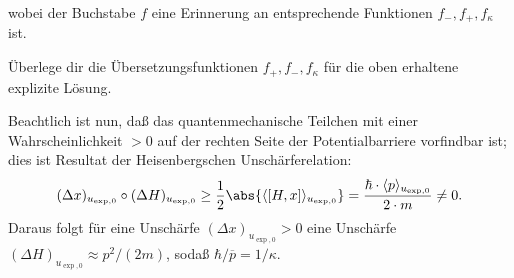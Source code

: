 \documentclass{subfiles}
\begin{document}
    wobei der Buchstabe $f$ eine Erinnerung an entsprechende Funktionen $f_-,f_+,f_\kappa$ ist. 
    \begin{Aufgabe}
        \nr{} Überlege dir die Übersetzungsfunktionen $f_+,f_-,f_\kappa$ für die oben erhaltene explizite Lösung. 
    \end{Aufgabe}
    Beachtlich ist nun, daß das quantenmechanische Teilchen mit einer Wahrscheinlichkeit $>0$ auf der rechten Seite der Potentialbarriere vorfindbar ist; dies ist Resultat der Heisenbergschen Unschärferelation:
    \[(\Delta x)_{u_{\exp,0}}\circ(\Delta H)_{u_{\exp,0}}\geq \frac{1}{2}\abs{\langle[H,x]\rangle_{u_{\exp,0}}} = \frac{\hbar\cdot\langle p\rangle_{u_{\exp,0}}}{2\cdot m}\neq 0.\]
    Daraus folgt für eine Unschärfe $(\Delta x)_{u_{\exp,0}}>0$ eine Unschärfe $(\Delta H)_{u_{\exp,0}} \approx p^2/(2m)$, sodaß $\hbar/\overline p = 1/\kappa$. 
    
\end{document}
